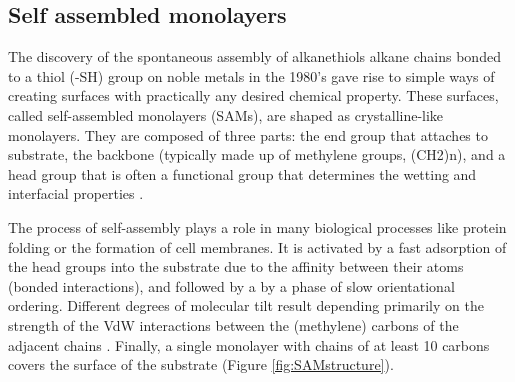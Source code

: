 \subsection{Self assembled monolayers}

The discovery of the spontaneous assembly of alkanethiols \textendash{}
alkane chains bonded to a thiol (-SH) group \textendash{} on noble
metals in the 1980's gave rise to simple ways of creating surfaces
with practically any desired chemical property. These surfaces, called
self-assembled monolayers (SAMs), are shaped as crystalline-like monolayers.
They are composed of three parts: the end group that attaches to substrate,
the backbone (typically made up of methylene groups, (CH2)n), and
a head group that is often a functional group that determines the
wetting \cite{abbott:1992} and interfacial properties \cite{godin:2004}.

The process of self-assembly plays a role in many biological processes
like protein folding or the formation of cell membranes. It is activated
by a fast adsorption of the head groups into the substrate due to
the affinity between their atoms (bonded interactions), and followed
by a by a phase of slow orientational ordering. Different degrees
of molecular tilt result depending primarily on the strength of the
VdW interactions between the (methylene) carbons of the adjacent chains
\cite{tao:1994}. Finally, a single monolayer with chains of at least
10 carbons covers the surface of the substrate (Figure \ref{fig:SAMstructure}).